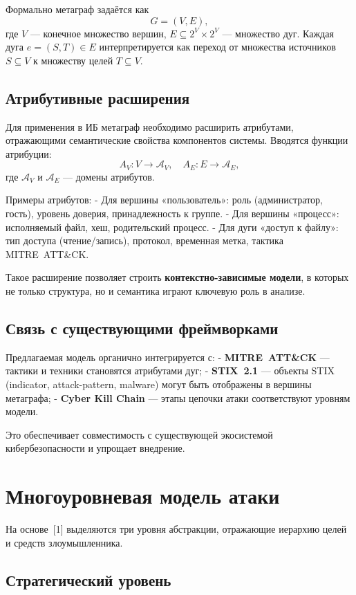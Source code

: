 \documentclass[12pt,a4paper]{extarticle}
\begin{document}
Формально метаграф задаётся как  
\[
G = (V, E),
\]  
где \(V\) — конечное множество вершин, \(E \subseteq 2^V \times 2^V\) — множество дуг. Каждая дуга \(e = (S, T) \in E\) интерпретируется как переход от множества источников \(S \subseteq V\) к множеству целей \(T \subseteq V\).

\subsection{Атрибутивные расширения}

Для применения в ИБ метаграф необходимо расширить атрибутами, отражающими семантические свойства компонентов системы. Вводятся функции атрибуции:
\[
A_V: V \to \mathcal{A}_V, \quad A_E: E \to \mathcal{A}_E,
\]  
где \(\mathcal{A}_V\) и \(\mathcal{A}_E\) — домены атрибутов.

Примеры атрибутов:
- Для вершины «пользователь»: роль (администратор, гость), уровень доверия, принадлежность к группе.
- Для вершины «процесс»: исполняемый файл, хеш, родительский процесс.
- Для дуги «доступ к файлу»: тип доступа (чтение/запись), протокол, временная метка, тактика MITRE~ATT\&CK.

Такое расширение позволяет строить \textbf{контекстно-зависимые модели}, в которых не только структура, но и семантика играют ключевую роль в анализе.

\subsection{Связь с существующими фреймворками}

Предлагаемая модель органично интегрируется с:
- \textbf{MITRE~ATT\&CK} — тактики и техники становятся атрибутами дуг;
- \textbf{STIX~2.1} — объекты STIX (indicator, attack-pattern, malware) могут быть отображены в вершины метаграфа;
- \textbf{Cyber Kill Chain} — этапы цепочки атаки соответствуют уровням модели.

Это обеспечивает совместимость с существующей экосистемой кибербезопасности и упрощает внедрение.

\section{Многоуровневая модель атаки}

На основе~[1] выделяются три уровня абстракции, отражающие иерархию целей и средств злоумышленника.

\subsection{Стратегический уровень}
\end{document}
